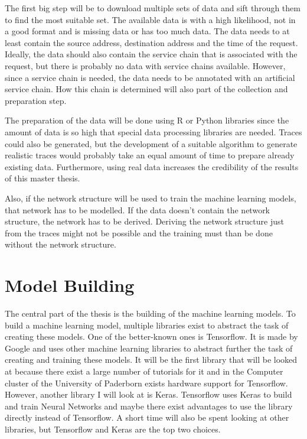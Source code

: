 \documentclass[12pt,a4paper]{article}
\begin{document}
	The first big step will be to download multiple sets of data and sift through them to find the most suitable set.
	The available data is with a high likelihood, not in a good format and is missing data or has too much data.
	The data needs to at least contain the source address, destination address and the time of the request.
	Ideally, the data should also contain the service chain that is associated with the request, but there is probably no data with service chains available.
	However, since a service chain is needed, the data needs to be annotated with an artificial service chain.
	How this chain is determined will also part of the collection and preparation step.
	
	The preparation of the data will be done using R or Python libraries since the amount of data is so high that special data processing libraries are needed.
	Traces could also be generated, but the development of a suitable algorithm to generate realistic traces would probably take an equal amount of time to prepare already existing data.
	Furthermore, using real data increases the credibility of the results of this master thesis.
	
	Also, if the network structure will be used to train the machine learning models, that network has to be modelled.
	If the data doesn't contain the network structure, the network has to be derived.
	Deriving the network structure just from the traces might not be possible and the training must than be done without the network structure.
	
	\section{Model Building}
	The central part of the thesis is the building of the machine learning models.
	To build a machine learning model, multiple libraries exist to abstract the task of creating these models.
	One of the better-known ones is Tensorflow. It is made by Google and uses other machine learning libraries to abstract further the task of creating and training these models. It will be the first library that will be looked at because there exist a large number of tutorials for it and in the Computer cluster of the University of Paderborn exists hardware support for Tensorflow. However, another library I will look at is Keras. Tensorflow uses Keras to build and train Neural Networks and maybe there exist advantages to use the library directly instead of Tensorflow. A short time will also be spent looking at other libraries, but Tensorflow and Keras are the top two choices.
	
\end{document}
